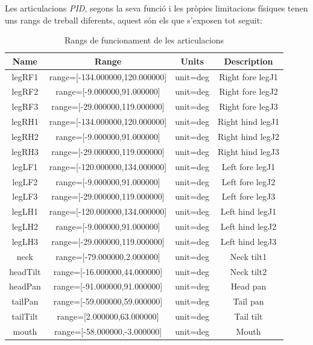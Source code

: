 \documentclass[12pt,a4paper,final,twoside]{article}
\begin{document}
Les articulacions \textit{PID}, segons la seva funció i les pròpies limitacions físiques tenen uns rangs de treball diferents, aquest són els que s'exposen tot seguit: 

\begin{table}[h]
\begin{center}
\begin{tabular}{| c | c | c | c |}
\hline
Name & Range & Units & Description\\ \hline \hline
legRF1    &    range=[-134.000000,120.000000]  & unit=deg & Right fore legJ1\\
legRF2    &    range=[-9.000000,91.000000]     & unit=deg & Right fore legJ2\\
legRF3    &    range=[-29.000000,119.000000]   & unit=deg & Right fore legJ3\\
legRH1    &    range=[-134.000000,120.000000]  & unit=deg & Right hind legJ1\\
legRH2    &    range=[-9.000000,91.000000]     & unit=deg & Right hind legJ2\\
legRH3    &    range=[-29.000000,119.000000]   & unit=deg & Right hind legJ3\\
legLF1    &    range=[-120.000000,134.000000]  & unit=deg & Left fore legJ1\\
legLF2    &    range=[-9.000000,91.000000]     & unit=deg & Left fore legJ2\\
legLF3    &    range=[-29.000000,119.000000]   & unit=deg & Left fore legJ3\\
legLH1    &    range=[-120.000000,134.000000]  & unit=deg & Left hind legJ1\\
legLH2    &    range=[-9.000000,91.000000]     & unit=deg & Left hind legJ2\\
legLH3    &    range=[-29.000000,119.000000]   & unit=deg & Left hind legJ3\\
neck      &    range=[-79.000000,2.000000]     & unit=deg & Neck tilt1\\
headTilt  &    range=[-16.000000,44.000000]    & unit=deg & Neck tilt2\\
headPan   &    range=[-91.000000,91.000000]    & unit=deg & Head pan\\
tailPan   &    range=[-59.000000,59.000000]    & unit=deg & Tail pan\\
tailTilt  &    range=[2.000000,63.000000]      & unit=deg & Tail tilt\\
mouth     &    range=[-58.000000,-3.000000]    & unit=deg & Mouth\\
\hline
\end{tabular}
\end{center}
\caption{Rangs de funcionament de les articulacions \cite{Urbi_Docs}}
\label{Taula-rangs-articulacions}
\end{table}
\end{document}
